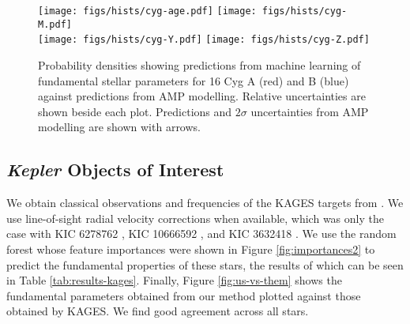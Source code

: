 \documentclass[manuscript]{aastex}
\begin{document}
\begin{figure*}
    \centering
    \texttt{[image: figs/hists/cyg-age.pdf]}\hfill
    \texttt{[image: figs/hists/cyg-M.pdf]}\\
    \texttt{[image: figs/hists/cyg-Y.pdf]}\hfill
    \texttt{[image: figs/hists/cyg-Z.pdf]}
    
    \caption{Probability densities showing predictions from machine learning of fundamental stellar parameters for 16 Cyg A (red) and B (blue) against predictions from AMP modelling. Relative uncertainties are shown beside each plot. Predictions and $2\sigma$ uncertainties from AMP modelling are shown with arrows.}
    \label{fig:16Cyg-hist}
\end{figure*}


\subsection{\emph{Kepler} Objects of Interest}
We obtain classical observations and frequencies of the KAGES targets from \citet{2015MNRAS.452.2127S}. We use line-of-sight radial velocity corrections when available, which was only the case with KIC 6278762 \citep{2002AJ....124.1144L}, KIC 10666592 \citep{2013A&A...554A..84M}, and KIC 3632418 \citep{2006AstL...32..759G}. We use the random forest whose feature importances were shown in Figure \ref{fig:importances2} to predict the fundamental properties of these stars, the results of which can be seen in Table \ref{tab:results-kages}. Finally, Figure \ref{fig:us-vs-them} shows the fundamental parameters obtained from our method plotted against those obtained by KAGES. We find good agreement across all stars.
\end{document}
